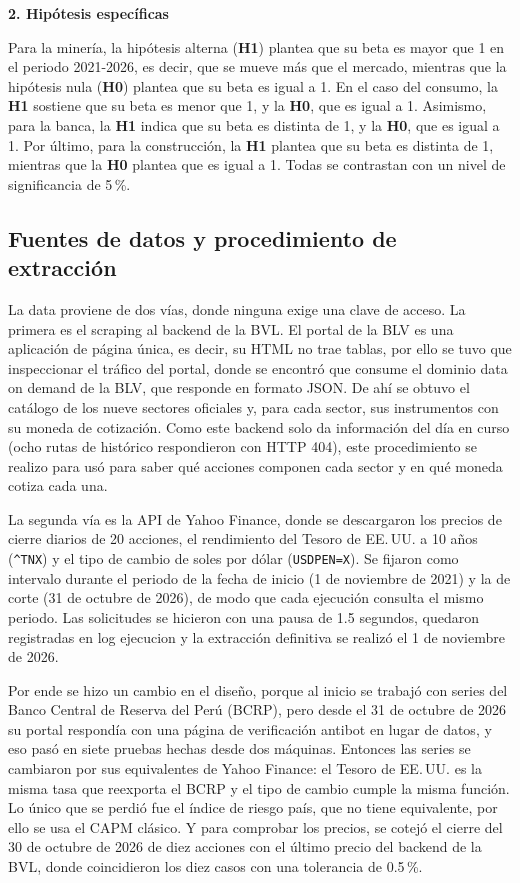 \documentclass[12pt]{article}
\begin{document}
\noindent\textbf{2. Hipótesis específicas}

Para la minería, la hipótesis alterna (\textbf{H1}) plantea que su beta es mayor que 1 en el periodo 2021-2026, es decir, que se mueve más que el mercado, mientras que la hipótesis nula (\textbf{H0}) plantea que su beta es igual a 1. En el caso del consumo, la \textbf{H1} sostiene que su beta es menor que 1, y la \textbf{H0}, que es igual a 1. Asimismo, para la banca, la \textbf{H1} indica que su beta es distinta de 1, y la \textbf{H0}, que es igual a 1. Por último, para la construcción, la \textbf{H1} plantea que su beta es distinta de 1, mientras que la \textbf{H0} plantea que es igual a 1. Todas se contrastan con un nivel de significancia de 5\,\%.

\subsection{Fuentes de datos y procedimiento de extracción}
La data proviene de dos vías, donde ninguna exige una clave de acceso. La primera es el scraping al backend de la BVL. El portal de la BLV es una aplicación de página única, es decir, su HTML no trae tablas, por ello se tuvo que inspeccionar el tráfico del portal, donde se encontró que consume el dominio data on demand de la BLV, que responde en formato JSON. De ahí se obtuvo el catálogo de los nueve sectores oficiales y, para cada sector, sus instrumentos con su moneda de cotización. Como este backend solo da información del día en curso (ocho rutas de histórico respondieron con HTTP 404), este procedimiento se realizo para usó para saber qué acciones componen cada sector y en qué moneda cotiza cada una.

La segunda vía es la API de Yahoo Finance, donde se descargaron los precios de cierre diarios de 20 acciones, el rendimiento del Tesoro de EE.\,UU. a 10 años (\texttt{\^{}TNX}) y el tipo de cambio de soles por dólar (\texttt{USDPEN=X}). Se fijaron como intervalo durante el periodo de la fecha de inicio (1 de noviembre de 2021) y la de corte (31 de octubre de 2026), de modo que cada ejecución consulta el mismo periodo. Las solicitudes se hicieron con una pausa de 1.5 segundos, quedaron registradas en log ejecucion y la extracción definitiva se realizó el 1 de noviembre de 2026.

Por ende se hizo un cambio en el diseño, porque al inicio se trabajó con series del Banco Central de Reserva del Perú (BCRP), pero desde el 31 de octubre de 2026 su portal respondía con una página de verificación antibot en lugar de datos, y eso pasó en siete pruebas hechas desde dos máquinas. Entonces las series se cambiaron por sus equivalentes de Yahoo Finance: el Tesoro de EE.\,UU. es la misma tasa que reexporta el BCRP y el tipo de cambio cumple la misma función. Lo único que se perdió fue el índice de riesgo país, que no tiene equivalente, por ello se usa el CAPM clásico. Y para comprobar los precios, se cotejó el cierre del 30 de octubre de 2026 de diez acciones con el último precio del backend de la BVL, donde coincidieron los diez casos con una tolerancia de 0.5\,\%.
\end{document}
